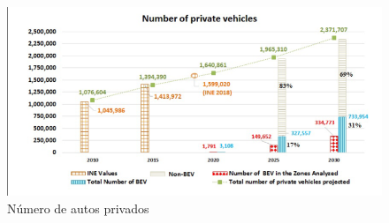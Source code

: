 \documentclass[letterpaper]{article}
\begin{document}
\begin{flushleft}
	\begin{figure}[htbp]
		\centering
		\includegraphics[scale=0.5]{grafica-2}
		\caption{Número de autos privados \cite{paredes}}
		\label{fig:grafica2}
	\end{figure}

\end{flushleft}
\end{document}
